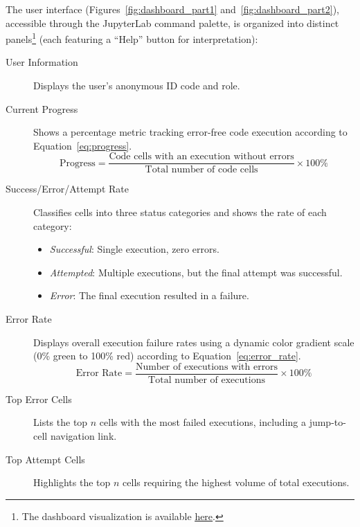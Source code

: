 \documentclass[sigconf]{acmart}
\begin{document}
The user interface (Figures~\ref{fig:dashboard_part1} and~\ref{fig:dashboard_part2}), accessible through the JupyterLab command palette, is organized into distinct panels\footnote{The dashboard visualization is available \href{https://git.uni-due.de/colaps/la-rp/group-4/la-extension/-/raw/master/MUC\%20-\%20StudentResearchCompetition/Dashboard/Dashboard.pdf?ref_type=heads&inline=true}{\color{blue}\underline{here}}.} (each featuring a ``Help'' button for interpretation):
\begin{description}
    \item[User Information] Displays the user's anonymous ID code and role.

    \item[Current Progress] Shows a percentage metric tracking error-free code execution according to Equation~\eqref{eq:progress}.
    \begin{equation}\label{eq:progress}
        \text{Progress} = \frac{\text{Code cells with an execution without errors}}{\text{Total number of code cells}}
        \times 100\%
    \end{equation}

    \item[Success/Error/Attempt Rate] Classifies cells into three status categories and shows the rate of each category:
    \begin{itemize}
        \item \emph{Successful}: Single execution, zero errors.
        \item \emph{Attempted}: Multiple executions, but the final attempt was successful.
        \item \emph{Error}: The final execution resulted in a failure.
    \end{itemize}

    \item[Error Rate] Displays overall execution failure rates using a dynamic color gradient scale (0\% green to 100\% red) according to Equation~\eqref{eq:error_rate}.
    \begin{equation}\label{eq:error_rate}
        \text{Error Rate} = \frac{\text{Number of executions with errors}}{\text{Total number of executions}}
        \times 100\%
    \end{equation}

    \item[Top Error Cells] Lists the top $n$ cells with the most failed executions, including a jump-to-cell navigation link.

    \item[Top Attempt Cells] Highlights the top $n$ cells requiring the highest volume of total executions.


\end{description}
\end{document}
